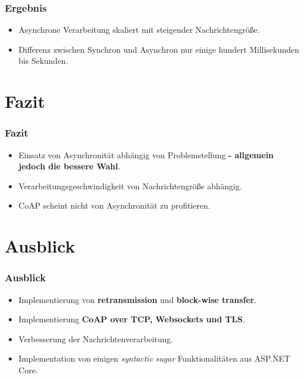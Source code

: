 \documentclass[11pt,t,usepdftitle=false,aspectratio=169,usenames,dvipsnames]{beamer}
\begin{document}
    \begin{frame}
        \frametitle{Ergebnis}
    
        \begin{itemize}
            \item<1-> Asynchrone Verarbeitung skaliert mit steigender Nachrichtengröße.
            \item<2-> Differenz zwischen Synchron und Asynchron nur einige hundert Millisekunden bis Sekunden.
        \end{itemize}
    \end{frame}

    \section{Fazit}
    \begin{frame}
        \frametitle{Fazit}
    
        \begin{itemize}
            \item<1-> Einsatz von Asynchronität abhängig von Problemstellung \textbf{\textcolor{uibkblue}{- allgemein jedoch die bessere Wahl}}.
            \item<2-> Verarbeitungsgeschwindigkeit von Nachrichtengröße abhängig.
            \item<3-> CoAP scheint nicht von Asynchronität zu profitieren.
        \end{itemize}
    \end{frame}

    \section{Ausblick}
    \begin{frame}
        \frametitle{Ausblick}
    
        \begin{itemize}
            \item<1-> Implementierung von \textbf{\textcolor{uibkblue}{retransmission}} und \textbf{\textcolor{uibkblue}{block-wise transfer}}.
            \item<2-> Implementierung \textbf{\textcolor{uibkblue}{CoAP over TCP, Websockets und TLS}}.
            \item<3-> Verbesserung der Nachrichtenverarbeitung.
            \item<4-> Implementation von einigen \textit{syntactic sugar} Funktionalitäten aus ASP.NET Core.
        \end{itemize}
    \end{frame}
\end{document}
